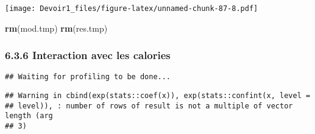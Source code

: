 \documentclass[]{article}
\newenvironment{Shaded}{\begin{snugshade}}{\end{snugshade}}
\newcommand{\KeywordTok}[1]{\textcolor[rgb]{0.13,0.29,0.53}{\textbf{#1}}}
\newcommand{\DataTypeTok}[1]{\textcolor[rgb]{0.13,0.29,0.53}{#1}}
\newcommand{\DecValTok}[1]{\textcolor[rgb]{0.00,0.00,0.81}{#1}}
\newcommand{\StringTok}[1]{\textcolor[rgb]{0.31,0.60,0.02}{#1}}
\newcommand{\OperatorTok}[1]{\textcolor[rgb]{0.81,0.36,0.00}{\textbf{#1}}}
\newcommand{\NormalTok}[1]{#1}
\begin{document}
\texttt{[image: Devoir1\_files/figure-latex/unnamed-chunk-87-8.pdf]}

\begin{Shaded}
\begin{Highlighting}[]
\KeywordTok{rm}\NormalTok{(mod.tmp)}
\KeywordTok{rm}\NormalTok{(res.tmp)}
\end{Highlighting}
\end{Shaded}

\subsubsection{6.3.6 Interaction avec les
calories}\label{interaction-avec-les-calories}

\begin{Shaded}
\end{Shaded}

\begin{verbatim}
## Waiting for profiling to be done...
\end{verbatim}

\begin{verbatim}
## Warning in cbind(exp(stats::coef(x)), exp(stats::confint(x, level =
## level)), : number of rows of result is not a multiple of vector length (arg
## 3)
\end{verbatim}
\end{document}
